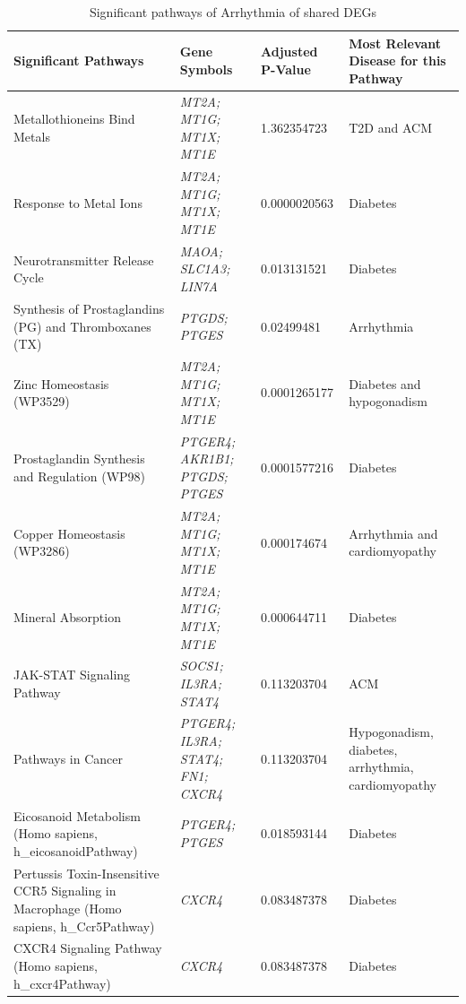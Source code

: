 \begin{longtable}{|p{3cm}|p{4cm}|p{2.4cm}|p{3cm}|}
    \caption[Significant pathways of Arrhythmia of shared DEGs]{Significant pathways of Arrhythmia of shared DEGs}
    \label{tab:Arrhythmia_pathways} \\
    \hline 
    \textbf{Significant Pathways} & \textbf{Gene Symbols} & \textbf{Adjusted P-Value} & \textbf{Most Relevant Disease for this Pathway} \\
    \hline
      \renewcommand{\arraystretch}{1.2} %
    \small
    Metallothioneins Bind Metals & \textit{MT2A; MT1G; MT1X; MT1E} & 1.362354723 & T2D and ACM \\
    \hline
    Response to Metal Ions & \textit{MT2A; MT1G; MT1X; MT1E} & 0.0000020563 & Diabetes \\
    \hline
    Neurotransmitter Release Cycle & \textit{MAOA; SLC1A3; LIN7A} & 0.013131521 & Diabetes \\
    \hline
    Synthesis of Prostaglandins (PG) and Thromboxanes (TX) & \textit{PTGDS; PTGES} & 0.02499481 & Arrhythmia \\
    \hline
    Zinc Homeostasis (WP3529) & \textit{MT2A; MT1G; MT1X; MT1E} & 0.0001265177 & Diabetes and hypogonadism \\
    \hline
    Prostaglandin Synthesis and Regulation (WP98) & \textit{PTGER4; AKR1B1; PTGDS; PTGES} & 0.0001577216 & Diabetes \\
    \hline
    Copper Homeostasis (WP3286) & \textit{MT2A; MT1G; MT1X; MT1E} & 0.000174674 & Arrhythmia and cardiomyopathy \\
    \hline
    Mineral Absorption & \textit{MT2A; MT1G; MT1X; MT1E} & 0.000644711 & Diabetes \\
    \hline
    JAK-STAT Signaling Pathway & \textit{SOCS1; IL3RA; STAT4} & 0.113203704 & ACM \\
    \hline
    Pathways in Cancer & \textit{PTGER4; IL3RA; STAT4; FN1; CXCR4} & 0.113203704 & Hypogonadism, diabetes, arrhythmia, cardiomyopathy \\
    \hline
    Eicosanoid Metabolism (Homo sapiens, h\_eicosanoidPathway) & \textit{PTGER4; PTGES} & 0.018593144 & Diabetes \\
    \hline
    Pertussis Toxin-Insensitive CCR5 Signaling in Macrophage (Homo sapiens, h\_Ccr5Pathway) & \textit{CXCR4} & 0.083487378 & Diabetes \\
    \hline
    CXCR4 Signaling Pathway (Homo sapiens, h\_cxcr4Pathway) & \textit{CXCR4} & 0.083487378 & Diabetes \\
    \hline
\end{longtable}

